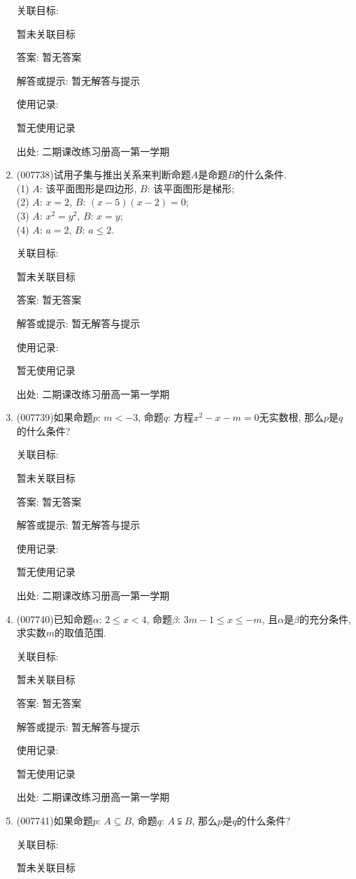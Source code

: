 \documentclass[10pt,a4paper]{article}
\begin{document}
\begin{enumerate}[1.]
关联目标:

暂未关联目标

答案: 暂无答案

解答或提示: 暂无解答与提示

使用记录:

暂无使用记录


出处: 二期课改练习册高一第一学期
\item { (007738)}试用子集与推出关系来判断命题$A$是命题$B$的什么条件.\\
(1) $A$: 该平面图形是四边形, $B$: 该平面图形是梯形;\\
(2) $A$: $x=2$, $B$: $(x-5)(x-2)=0$;\\
(3) $A$: $x^2=y^2$, $B$: $x=y$;\\
(4) $A$: $a=2$, $B$: $a\le 2$.


关联目标:

暂未关联目标

答案: 暂无答案

解答或提示: 暂无解答与提示

使用记录:

暂无使用记录


出处: 二期课改练习册高一第一学期
\item { (007739)}如果命题$p$: $m<-3$, 命题$q$: 方程$x^2-x-m=0$无实数根, 那么$p$是$q$的什么条件?


关联目标:

暂未关联目标

答案: 暂无答案

解答或提示: 暂无解答与提示

使用记录:

暂无使用记录


出处: 二期课改练习册高一第一学期
\item { (007740)}已知命题$\alpha$: $2\le x<4$, 命题$\beta$: $3m-1\le x\le -m$, 且$\alpha$是$\beta$的充分条件, 求实数$m$的取值范围.


关联目标:

暂未关联目标

答案: 暂无答案

解答或提示: 暂无解答与提示

使用记录:

暂无使用记录


出处: 二期课改练习册高一第一学期
\item { (007741)}如果命题$p$: $A\subseteq B$, 命题$q$: $A\subsetneqq B$, 那么$p$是$q$的什么条件?


关联目标:

暂未关联目标


\end{enumerate}
\end{document}
